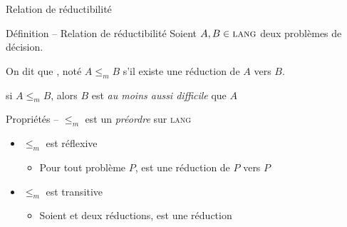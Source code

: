 
\begingroup

\begin{frame}{Relation de réductibilité}

  \begin{block}{Définition -- Relation de réductibilité}
    Soient $A, B \in \textsc{lang}$ deux problèmes de décision.
    
    On dit que , noté \alert{$A \leq_m B$} s'il existe une réduction de $A$ vers $B$. 

    \vspace{2mm}
     si $A \leq_m B$, alors $B$ est \og \emph{au moins aussi difficile} \fg que $A$
  \end{block}
  
  \begin{block}{Propriétés -- $\leq_m$ est un \emph{préordre} sur \textsc{lang}}
    \begin{itemize}
    \item $\leq_m$ est réflexive
      \begin{itemize}
      \item Pour tout problème $P$,  est une réduction de $P$ vers $P$
      \end{itemize}
    \item $\leq_m$ est transitive
      \begin{itemize}
      \item Soient  et  deux réductions,  est une réduction
      \end{itemize}
    \end{itemize}

    \vspace{3mm}
    \begin{center}
\end{center}
\end{block}
\end{frame}
